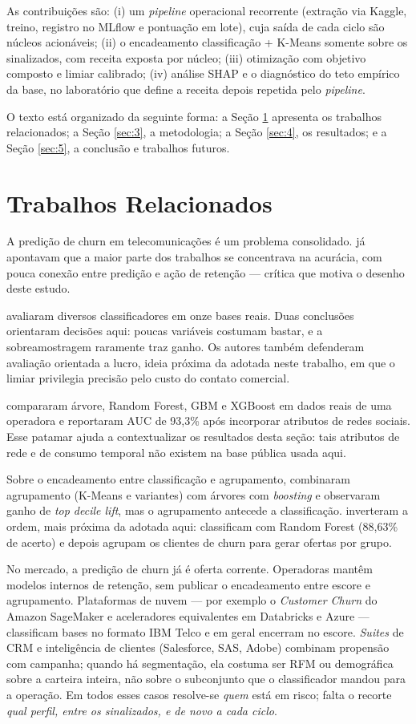 \documentclass[12pt]{article}
\begin{document}
As contribuições são: (i) um \textit{pipeline} operacional recorrente
(extração via Kaggle, treino, registro no MLflow e pontuação em lote), cuja saída
de cada ciclo são núcleos acionáveis; (ii) o encadeamento classificação +
K-Means somente sobre os sinalizados, com receita exposta por núcleo;
(iii) otimização com objetivo composto e limiar calibrado; (iv) análise
SHAP e o diagnóstico do teto empírico da base, no laboratório que define a
receita depois repetida pelo \textit{pipeline}.

O texto está organizado da seguinte forma: a Seção \ref{sec:2} apresenta os
trabalhos relacionados; a Seção \ref{sec:3}, a metodologia; a Seção \ref{sec:4},
os resultados; e a Seção \ref{sec:5}, a conclusão e trabalhos futuros.

\section{Trabalhos Relacionados}
\label{sec:2}

A predição de churn em telecomunicações é um problema consolidado.
\cite{hadden2007} já apontavam que a maior parte dos trabalhos se concentrava
na acurácia, com pouca conexão entre predição e ação de retenção --- crítica
que motiva o desenho deste estudo.

\cite{verbeke2012} avaliaram diversos classificadores em onze bases reais.
Duas conclusões orientaram decisões aqui: poucas variáveis costumam bastar, e
a sobreamostragem raramente traz ganho. Os autores também defenderam
avaliação orientada a lucro, ideia próxima da adotada neste trabalho, em que
o limiar privilegia precisão pelo custo do contato comercial.

\cite{ahmad2019} compararam árvore, Random Forest, GBM e XGBoost em dados
reais de uma operadora e reportaram AUC de 93,3\% após incorporar atributos
de redes sociais. Esse patamar ajuda a contextualizar os resultados desta
seção: tais atributos de rede e de consumo temporal não existem na base
pública usada aqui.

Sobre o encadeamento entre classificação e agrupamento, \cite{bose2009}
combinaram agrupamento (K-Means e variantes) com árvores com \textit{boosting}
e observaram ganho de \textit{top decile lift}, mas o agrupamento antecede a
classificação. \cite{ullah2019} inverteram a ordem, mais próxima da adotada
aqui: classificam com Random Forest (88,63\% de acerto) e depois agrupam os
clientes de churn para gerar ofertas por grupo.

No mercado, a predição de churn já é oferta corrente. Operadoras mantêm
modelos internos de retenção, sem publicar o encadeamento entre escore e
agrupamento. Plataformas de nuvem --- por exemplo o \textit{Customer Churn}
do Amazon SageMaker e aceleradores equivalentes em Databricks e Azure ---
classificam bases no formato IBM Telco e em geral encerram no escore.
\textit{Suites} de CRM e inteligência de clientes (Salesforce, SAS, Adobe)
combinam propensão com campanha; quando há segmentação, ela costuma ser RFM
ou demográfica sobre a carteira inteira, não sobre o subconjunto que o
classificador mandou para a operação. Em todos esses casos resolve-se
\textit{quem} está em risco; falta o recorte \textit{qual perfil, entre os
sinalizados, e de novo a cada ciclo}.
\end{document}
